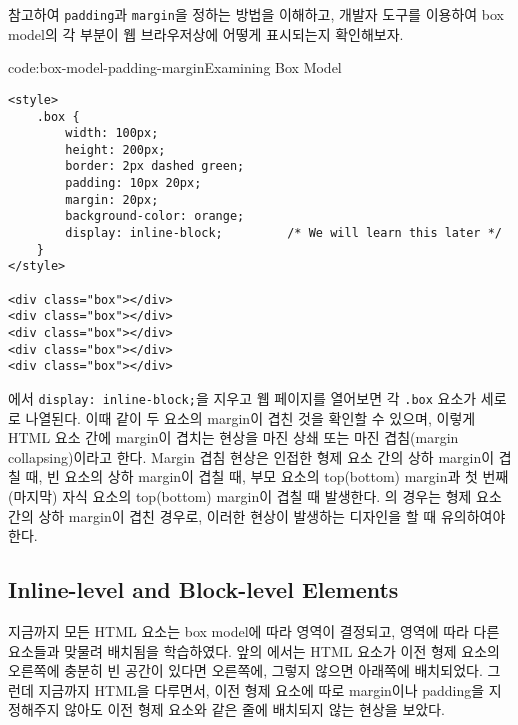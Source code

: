 \을 참고하여 \texttt{padding}과 \texttt{margin}을 정하는 방법을 이해하고, 개발자 도구를 이용하여 box model의 각 부분이 웹 브라우저상에 어떻게 표시되는지 확인해보자. 

\begin{codeenv}{code:box-model-padding-margin}{Examining Box Model}\begin{verbatim}
<style>
    .box {
        width: 100px;
        height: 200px;
        border: 2px dashed green;
        padding: 10px 20px;
        margin: 20px;
        background-color: orange;
        display: inline-block;         /* We will learn this later */
    }
</style>

<div class="box"></div>
<div class="box"></div>
<div class="box"></div>
<div class="box"></div>
<div class="box"></div>
\end{verbatim}
\end{codeenv}

에서 \texttt{display: inline-block;}을 지우고 웹 페이지를 열어보면 각 \texttt{.box} 요소가 세로로 나열된다. 이때 \과 같이 두 요소의 margin이 겹친 것을 확인할 수 있으며, 이렇게 HTML 요소 간에 margin이 겹치는 현상을 마진 상쇄 또는 마진 겹침(margin collapsing)이라고 한다. Margin 겹침 현상은 인접한 형제 요소 간의 상하 margin이 겹칠 때, 빈 요소의 상하 margin이 겹칠 때, 부모 요소의 top(bottom) margin과 첫 번째(마지막) 자식 요소의 top(bottom) margin이 겹칠 때 발생한다. 의 경우는 형제 요소 간의 상하 margin이 겹친 경우로, 이러한 현상이 발생하는 디자인을 할 때 유의하여야 한다.


\subsection*{Inline-level and Block-level Elements}

지금까지 모든 HTML 요소는 box model에 따라 영역이 결정되고, 영역에 따라 다른 요소들과 맞물려 배치됨을 학습하였다. 앞의 에서는 HTML 요소가 이전 형제 요소의 오른쪽에 충분히 빈 공간이 있다면 오른쪽에, 그렇지 않으면 아래쪽에 배치되었다. 그런데 지금까지 HTML을 다루면서, 이전 형제 요소에 따로 margin이나 padding을 지정해주지 않아도 이전 형제 요소와 같은 줄에 배치되지 않는 현상을 보았다.

